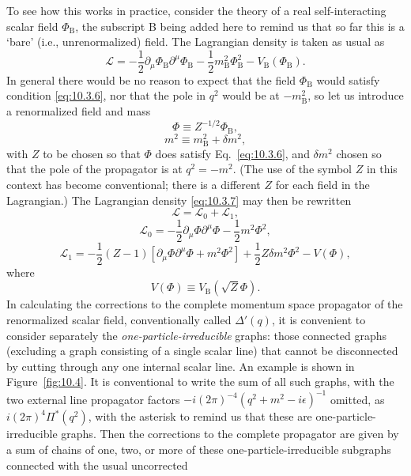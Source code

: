 To see how this works in practice, consider the theory of a real
self-interacting scalar field $\Phi_{\mathrm B}$, the subscript B being added
here to remind us that so far this is a `bare' (i.e., unrenormalized) field. The
Lagrangian density is taken as usual as
\begin{equation}
\mathcal L=-\frac12\partial_\mu\Phi_{\mathrm B}\partial^\mu\Phi_{\mathrm B}
-\frac12m_{\mathrm B}^2\Phi_{\mathrm B}^2-V_{\mathrm B}(\Phi_{\mathrm B}).
\tag{10.3.7}\label{eq:10.3.7}
\end{equation}
In general there would be no reason to expect that the field
$\Phi_{\mathrm B}$ would satisfy condition \eqref{eq:10.3.6}, nor that the pole
in $q^2$ would be at $-m_{\mathrm B}^2$, so let us introduce a renormalized
field and mass
\begin{equation}
\Phi\equiv Z^{-1/2}\Phi_{\mathrm B},
\tag{10.3.8}\label{eq:10.3.8}
\end{equation}
\begin{equation}
m^2\equiv m_{\mathrm B}^2+\delta m^2,
\tag{10.3.9}\label{eq:10.3.9}
\end{equation}
with $Z$ to be chosen so that $\Phi$ does satisfy Eq.~\eqref{eq:10.3.6}, and
$\delta m^2$ chosen so that the pole of the propagator is at $q^2=-m^2$. (The
use of the symbol $Z$ in this context has become conventional; there is a
different $Z$ for each field in the Lagrangian.) The Lagrangian density
\eqref{eq:10.3.7} may then be rewritten
\begin{equation}
\mathcal L=\mathcal L_0+\mathcal L_1,
\tag{10.3.10}\label{eq:10.3.10}
\end{equation}
\begin{equation}
\mathcal L_0=-\frac12\partial_\mu\Phi\partial^\mu\Phi-\frac12m^2\Phi^2,
\tag{10.3.11}\label{eq:10.3.11}
\end{equation}
\begin{equation}
\mathcal L_1=-\frac12(Z-1)
[\partial_\mu\Phi\partial^\mu\Phi+m^2\Phi^2]
+\frac12Z\delta m^2\Phi^2-V(\Phi),
\tag{10.3.12}\label{eq:10.3.12}
\end{equation}
where
\[
V(\Phi)\equiv V_{\mathrm B}(\sqrt Z\Phi).
\]
In calculating the corrections to the complete momentum space propagator of
the renormalized scalar field, conventionally called $\Delta'(q)$, it is
convenient to consider separately the \emph{one-particle-irreducible} graphs:
those connected graphs (excluding a graph consisting of a single scalar line)
that cannot be disconnected by cutting through any one internal scalar line.
An example is shown in Figure~\ref{fig:10.4}. It is conventional to write the
sum of all such graphs, with the two external line propagator factors
$-i(2\pi)^{-4}(q^2+m^2-i\epsilon)^{-1}$ omitted, as
$i(2\pi)^4\Pi^*(q^2)$, with the asterisk to remind us that these are
one-particle-irreducible graphs. Then the corrections to the complete
propagator are given by a sum of chains of one, two, or more of these
one-particle-irreducible subgraphs connected with the usual uncorrected

